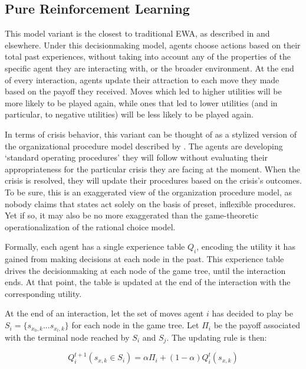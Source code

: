 \subsection{Pure Reinforcement Learning}\label{pure-reinforcement-learning}

This model variant is the closest to traditional EWA, as described in \citet{galla_2013} and elsewhere. Under this decisionmaking model, agents choose actions based on their total past experiences, without taking into account any of the properties of the specific agent they are interacting with, or the broader environment. At the end of every interaction, agents update their attraction to each move they made based on the payoff they received. Moves which led to higher utilities will be more likely to be played again, while ones that led to lower utilities (and in particular, to negative utilities) will be less likely to be played again.

In terms of crisis behavior, this variant can be thought of as a stylized version of the organizational procedure model described by \citet{allison_1999}. The agents are developing `standard operating procedures' they will follow without evaluating their appropriateness for the particular crisis they are facing at the moment. When the crisis is resolved, they will update their procedures based on the crisis's outcomes. To be sure, this is an exaggerated view of the organization procedure model, as nobody claims that states act solely on the basis of preset, inflexible procedures. Yet if so, it may also be no more exaggerated than the game-theoretic operationalization of the rational choice model.

Formally, each agent has a single experience table $Q_i$, encoding the utility it has gained from making decisions at each node in the past. This experience table drives the decisionmaking at each node of the game tree, until the interaction ends. At that point, the table is updated at the end of the interaction with the corresponding utility.

At the end of an interaction, let the set of moves agent $i$ has decided to play be $S_i = \{ s_{x_0,k}... s_{x_l,k} \}$ for each node in the game tree. Let $\Pi _i$ be the payoff associated with the terminal node reached by $S_i$ and $S_j$. The updating rule is then:

\begin{equation}
    Q^{t+1}_i(s_{x,k} \in S_i) = \alpha \Pi _i +  (1-\alpha) Q^{t}_i(s_{x,k}) 
\end{equation}


